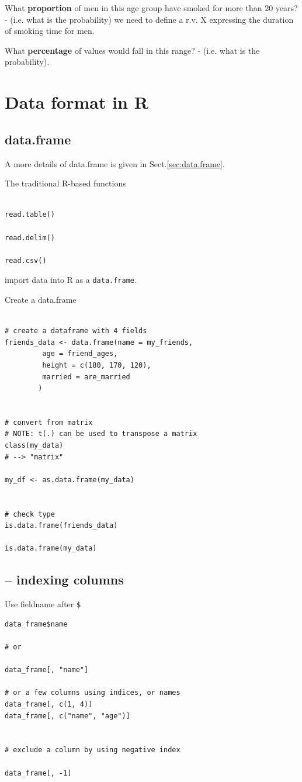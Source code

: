 What {\bf proportion} of men in this age group have smoked for more
than 20 years? - (i.e. what is the probability) we need to define a
r.v. X expressing the duration of smoking time for men.

What {\bf percentage} of values would fall in this range? - (i.e. what
is the probability). 


\section{Data format in R}


\subsection{data.frame}
\label{sec:data.frame-intro}


A more details of data.frame is given in Sect.\ref{sec:data.frame}.

The traditional R-based functions
\begin{verbatim}

read.table()

read.delim()

read.csv()
\end{verbatim}
import data into R as a \verb!data.frame!.


Create a data.frame
\begin{verbatim}

# create a dataframe with 4 fields
friends_data <- data.frame(name = my_friends,
         age = friend_ages,
         height = c(180, 170, 120),
         married = are_married
        )
        
        
# convert from matrix
# NOTE: t(.) can be used to transpose a matrix
class(my_data)
# --> "matrix"

my_df <- as.data.frame(my_data)
    
        
# check type
is.data.frame(friends_data)

is.data.frame(my_data)
\end{verbatim}

\subsection{-- indexing columns}


Use fieldname after \verb!$!
\begin{verbatim}
data_frame$name

# or

data_frame[, "name"]

# or a few columns using indices, or names
data_frame[, c(1, 4)]
data_frame[, c("name", "age")]


# exclude a column by using negative index

data_frame[, -1]
\end{verbatim}



